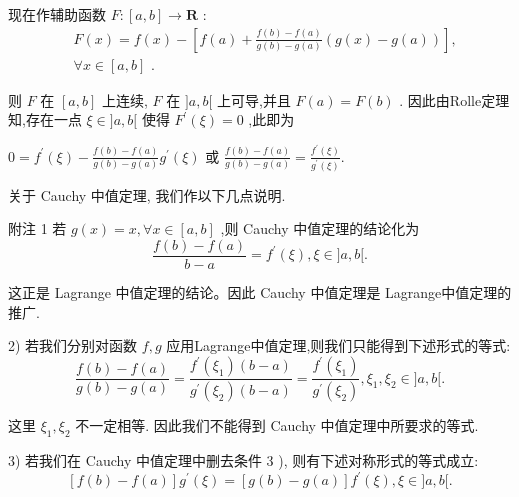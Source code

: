 现在作辅助函数 $F : \left\lbrack  {a,b}\right\rbrack   \rightarrow  \mathbf{R}$ :
\begin{align*}
	&F\left( x\right)  = f\left( x\right)  - \left\lbrack  {f\left( a\right)  + \frac{f\left( b\right)  - f\left( a\right) }{g\left( b\right)  - g\left( a\right) }\left( {g\left( x\right)  - g\left( a\right) }\right) }\right\rbrack  ,\\
	&\forall x \in  \left\lbrack  {a,b}\right\rbrack  \text{ . }
\end{align*}

则 $F$ 在 $\left\lbrack  {a,b}\right\rbrack$ 上连续, $F$ 在 $\rbrack a,b\lbrack$ 上可导,并且 $F\left( a\right)  = F\left( b\right)$ . 因此由Rolle定理知,存在一点 $\xi  \in  \rbrack a,b\lbrack$ 使得 ${F}^{\prime }\left( \xi \right)  = 0$ ,此即为

$0 = {f}^{\prime }\left( \xi \right)  - \frac{f\left( b\right)  - f\left( a\right) }{g\left( b\right)  - g\left( a\right) }{g}^{\prime }\left( \xi \right)$ 或 $\frac{f\left( b\right)  - f\left( a\right) }{g\left( b\right)  - g\left( a\right) } = \frac{{f}^{\prime }\left( \xi \right) }{{g}^{\prime }\left( \xi \right) }.$

关于 Cauchy 中值定理, 我们作以下几点说明.

附注 1 若 $g\left( x\right)  = x,\forall x \in  \left\lbrack  {a,b}\right\rbrack$ ,则 Cauchy 中值定理的结论化为
$$\frac{f\left( b\right)  - f\left( a\right) }{b - a} = {f}^{\prime }\left( \xi \right) ,\xi  \in  \rbrack a,b\lbrack .$$

这正是 Lagrange 中值定理的结论。因此 Cauchy 中值定理是 Lagrange中值定理的推广.

2) 若我们分别对函数 $f,g$ 应用Lagrange中值定理,则我们只能得到下述形式的等式:
$$\frac{f\left( b\right)  - f\left( a\right) }{g\left( b\right)  - g\left( a\right) } = \frac{{f}^{\prime }\left( {\xi }_{1}\right) \left( {b - a}\right) }{{g}^{\prime }\left( {\xi }_{2}\right) \left( {b - a}\right) } = \frac{{f}^{\prime }\left( {\xi }_{1}\right) }{{g}^{\prime }\left( {\xi }_{2}\right) },{\xi }_{1},{\xi }_{2} \in  \rbrack a,b\lbrack .$$

这里 ${\xi }_{1},{\xi }_{2}$ 不一定相等. 因此我们不能得到 Cauchy 中值定理中所要求的等式.

3) 若我们在 Cauchy 中值定理中删去条件 3 ), 则有下述对称形式的等式成立:
$$\left\lbrack  {f\left( b\right)  - f\left( a\right) }\right\rbrack  {g}^{\prime }\left( \xi \right)  = \left\lbrack  {g\left( b\right)  - g\left( a\right) }\right\rbrack  {f}^{\prime }\left( \xi \right) ,\xi  \in  \rbrack a,b\lbrack .$$

